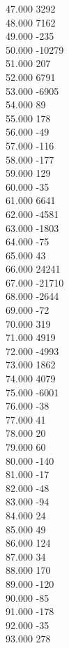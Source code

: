 { 47.000	3292 \\
 48.000	7162 \\
 49.000	-235 \\
 50.000	-10279 \\
 51.000	207 \\
 52.000	6791 \\
 53.000	-6905 \\
 54.000	89 \\
 55.000	178 \\
 56.000	-49 \\
 57.000	-116 \\
 58.000	-177 \\
 59.000	129 \\
 60.000	-35 \\
 61.000	6641 \\
 62.000	-4581 \\
 63.000	-1803 \\
 64.000	-75 \\
 65.000	43 \\
 66.000	24241 \\
 67.000	-21710 \\
 68.000	-2644 \\
 69.000	-72 \\
 70.000	319 \\
 71.000	4919 \\
 72.000	-4993 \\
 73.000	1862 \\
 74.000	4079 \\
 75.000	-6001 \\
 76.000	-38 \\
 77.000	41 \\
 78.000	20 \\
 79.000	60 \\
 80.000	-140 \\
 81.000	-17 \\
 82.000	-48 \\
 83.000	-94 \\
 84.000	24 \\
 85.000	49 \\
 86.000	124 \\
 87.000	34 \\
 88.000	170 \\
 89.000	-120 \\
 90.000	-85 \\
 91.000	-178 \\
 92.000	-35 \\
 93.000	278 \\
}
